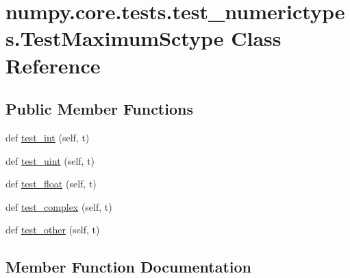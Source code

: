 \hypertarget{classnumpy_1_1core_1_1tests_1_1test__numerictypes_1_1TestMaximumSctype}{}\section{numpy.\+core.\+tests.\+test\+\_\+numerictypes.\+Test\+Maximum\+Sctype Class Reference}
\label{classnumpy_1_1core_1_1tests_1_1test__numerictypes_1_1TestMaximumSctype}
\subsection*{Public Member Functions}
\begin{DoxyCompactItemize}
\item 
def \hyperlink{classnumpy_1_1core_1_1tests_1_1test__numerictypes_1_1TestMaximumSctype_a38749d3acbc1b259d5ccf8fd86e45b59}{test\+\_\+int} (self, t)
\item 
def \hyperlink{classnumpy_1_1core_1_1tests_1_1test__numerictypes_1_1TestMaximumSctype_ad1cb12bf273bb490171533ee5e2957d8}{test\+\_\+uint} (self, t)
\item 
def \hyperlink{classnumpy_1_1core_1_1tests_1_1test__numerictypes_1_1TestMaximumSctype_a5d7d09d560b38657b03ae7ce87ae7a6d}{test\+\_\+float} (self, t)
\item 
def \hyperlink{classnumpy_1_1core_1_1tests_1_1test__numerictypes_1_1TestMaximumSctype_a1a797856681c2878905b80602d9c6a85}{test\+\_\+complex} (self, t)
\item 
def \hyperlink{classnumpy_1_1core_1_1tests_1_1test__numerictypes_1_1TestMaximumSctype_aa6e289dd7c90bfd88280c280db752581}{test\+\_\+other} (self, t)
\end{DoxyCompactItemize}


\subsection{Member Function Documentation}
\mbox{\label{classnumpy_1_1core_1_1tests_1_1test__numerictypes_1_1TestMaximumSctype_a1a797856681c2878905b80602d9c6a85}} 
